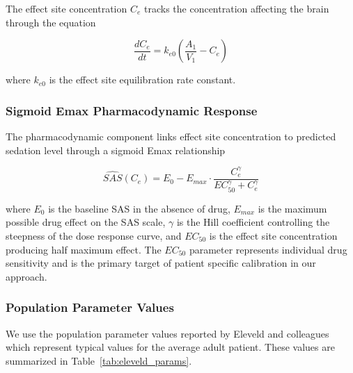 \documentclass[11pt,a4paper]{article}
\begin{document}
The effect site concentration $C_e$ tracks the concentration affecting
the brain through the equation

\begin{equation}
\frac{dC_e}{dt} = k_{e0}\left(\frac{A_1}{V_1} - C_e\right)
\end{equation}

where $k_{e0}$ is the effect site equilibration rate constant.

\subsubsection{Sigmoid Emax Pharmacodynamic Response}

The pharmacodynamic component links effect site concentration to
predicted sedation level through a sigmoid Emax relationship

\begin{equation}
\widehat{SAS}(C_e) = E_0 - E_{max} \cdot \frac{C_e^\gamma}{EC_{50}^\gamma + C_e^\gamma}
\end{equation}

where $E_0$ is the baseline SAS in the absence of drug, $E_{max}$ is
the maximum possible drug effect on the SAS scale, $\gamma$ is the
Hill coefficient controlling the steepness of the dose response curve,
and $EC_{50}$ is the effect site concentration producing half maximum
effect. The $EC_{50}$ parameter represents individual drug sensitivity
and is the primary target of patient specific calibration in our
approach.

\subsubsection{Population Parameter Values}

We use the population parameter values reported by Eleveld and colleagues
which represent typical values for the average adult patient. These
values are summarized in Table~\ref{tab:eleveld_params}.
\end{document}

